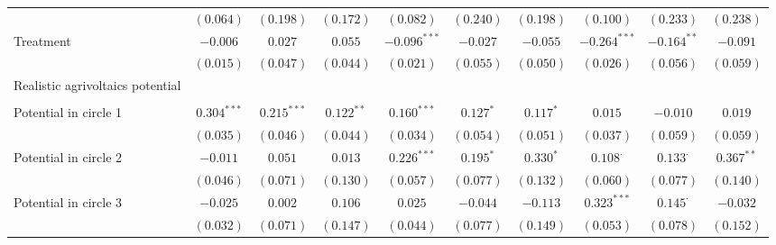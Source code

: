 \begin{center}
\begin{small}
\begin{longtable}{l@{} c@{} c@{} c@{} c@{} c@{} c@{} c@{} c@{} c@{}}
                                    & $(0.064)$       & $(0.198)$        & $(0.172)$    & $(0.082)$       & $(0.240)$        & $(0.198)$        & $(0.100)$       & $(0.233)$       & $(0.238)$       \\
Treatment                           & $-0.006$        & $0.027$          & $0.055$      & $-0.096^{***}$  & $-0.027$         & $-0.055$         & $-0.264^{***}$  & $-0.164^{**}$   & $-0.091$        \\
                                    & $(0.015)$       & $(0.047)$        & $(0.044)$    & $(0.021)$       & $(0.055)$        & $(0.050)$        & $(0.026)$       & $(0.056)$       & $(0.059)$       \\
Realistic agrivoltaics potential    &                 &                  &              &                 &                  &                  &                 &                 &                 \\
                                    &                 &                  &              &                 &                  &                  &                 &                 &                 \\
\quad Potential in circle 1         & $0.304^{***}$   & $0.215^{***}$    & $0.122^{**}$ & $0.160^{***}$   & $0.127^{*}$      & $0.117^{*}$      & $0.015$         & $-0.010$        & $0.019$         \\
                                    & $(0.035)$       & $(0.046)$        & $(0.044)$    & $(0.034)$       & $(0.054)$        & $(0.051)$        & $(0.037)$       & $(0.059)$       & $(0.059)$       \\
\quad Potential in circle 2         & $-0.011$        & $0.051$          & $0.013$      & $0.226^{***}$   & $0.195^{*}$      & $0.330^{*}$      & $0.108^{\cdot}$ & $0.133^{\cdot}$ & $0.367^{**}$    \\
                                    & $(0.046)$       & $(0.071)$        & $(0.130)$    & $(0.057)$       & $(0.077)$        & $(0.132)$        & $(0.060)$       & $(0.077)$       & $(0.140)$       \\
\quad Potential in circle 3         & $-0.025$        & $0.002$          & $0.106$      & $0.025$         & $-0.044$         & $-0.113$         & $0.323^{***}$   & $0.145^{\cdot}$ & $-0.032$        \\
                                    & $(0.032)$       & $(0.071)$        & $(0.147)$    & $(0.044)$       & $(0.077)$        & $(0.149)$        & $(0.053)$       & $(0.078)$       & $(0.152)$       \\

\end{longtable}
\end{small}
\end{center}

